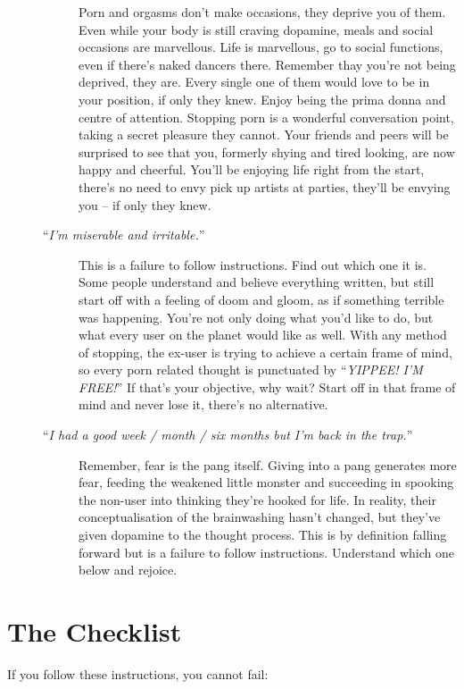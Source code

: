 \documentclass[
]{book}
\begin{document}
\begin{description}
\begin{description}
Porn and orgasms don't make occasions, they deprive you of them. Even while your body is still craving dopamine, meals and social occasions are marvellous. Life is marvellous, go to social functions, even if there's naked dancers there. Remember thay you're not being deprived, they are. Every single one of them would love to be in your position, if only they knew. Enjoy being the prima donna and centre of attention. Stopping porn is a wonderful conversation point, taking a secret pleasure they cannot. Your friends and peers will be surprised to see that you, formerly shying and tired looking, are now happy and cheerful. You'll be enjoying life right from the start, there's no need to envy pick up artists at parties, they'll be envying you -- if only they knew.
\item[``\emph{I'm miserable and irritable.}'']
This is a failure to follow instructions. Find out which one it is. Some people understand and believe everything written, but still start off with a feeling of doom and gloom, as if something terrible was happening. You're not only doing what you'd like to do, but what every user on the planet would like as well. With any method of stopping, the ex-user is trying to achieve a certain frame of mind, so every porn related thought is punctuated by ``\emph{YIPPEE! I'M FREE!}'' If that's your objective, why wait? Start off in that frame of mind and never lose it, there's no alternative.
\item[``\emph{I had a good week / month / six months but I'm back in the trap.}'']
Remember, fear is the pang itself. Giving into a pang generates more fear, feeding the weakened little monster and succeeding in spooking the non-user into thinking they're hooked for life. In reality, their conceptualisation of the brainwashing hasn't changed, but they've given dopamine to the thought process. This is by definition falling forward but is a failure to follow instructions. Understand which one below and rejoice.
\end{description}
\end{description}

\hypertarget{the-checklist}{%
\section{The Checklist}\label{the-checklist}}

If you follow these instructions, you cannot fail:
\end{document}
